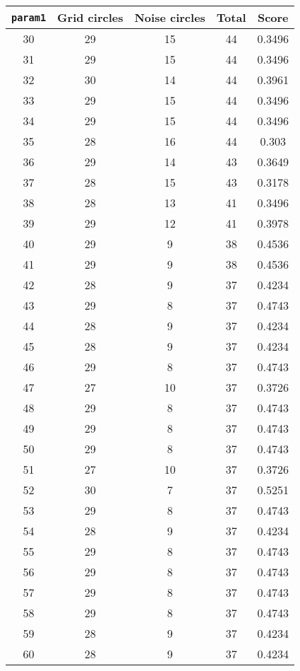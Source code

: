 \documentclass[letterpaper, 12pt]{article}
\begin{document}
\begin{longtable}{|c|c|c|c|c|}
\hline
\textbf{\texttt{param1}} & \textbf{Grid circles} & \textbf{Noise circles} & \textbf{Total} & \textbf{Score} \\
\hline
30 & 29 & 15 & 44 & 0.3496 \\
\hline
31 & 29 & 15 & 44 & 0.3496 \\
\hline
32 & 30 & 14 & 44 & 0.3961 \\
\hline
33 & 29 & 15 & 44 & 0.3496 \\
\hline
34 & 29 & 15 & 44 & 0.3496 \\
\hline
35 & 28 & 16 & 44 & 0.303 \\
\hline
36 & 29 & 14 & 43 & 0.3649 \\
\hline
37 & 28 & 15 & 43 & 0.3178 \\
\hline
38 & 28 & 13 & 41 & 0.3496 \\
\hline
39 & 29 & 12 & 41 & 0.3978 \\
\hline
40 & 29 & 9 & 38 & 0.4536 \\
\hline
41 & 29 & 9 & 38 & 0.4536 \\
\hline
42 & 28 & 9 & 37 & 0.4234 \\
\hline
43 & 29 & 8 & 37 & 0.4743 \\
\hline
44 & 28 & 9 & 37 & 0.4234 \\
\hline
45 & 28 & 9 & 37 & 0.4234 \\
\hline
46 & 29 & 8 & 37 & 0.4743 \\
\hline
47 & 27 & 10 & 37 & 0.3726 \\
\hline
48 & 29 & 8 & 37 & 0.4743 \\
\hline
49 & 29 & 8 & 37 & 0.4743 \\
\hline
50 & 29 & 8 & 37 & 0.4743 \\
\hline
51 & 27 & 10 & 37 & 0.3726 \\
\hline
52 & 30 & 7 & 37 & 0.5251 \\
\hline
53 & 29 & 8 & 37 & 0.4743 \\
\hline
54 & 28 & 9 & 37 & 0.4234 \\
\hline
55 & 29 & 8 & 37 & 0.4743 \\
\hline
56 & 29 & 8 & 37 & 0.4743 \\
\hline
57 & 29 & 8 & 37 & 0.4743 \\
\hline
58 & 29 & 8 & 37 & 0.4743 \\
\hline
59 & 28 & 9 & 37 & 0.4234 \\
\hline
60 & 28 & 9 & 37 & 0.4234 \\
\hline

\end{longtable}
\end{document}
